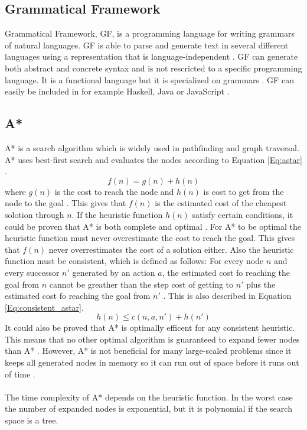 \subsection{Grammatical Framework}
Grammatical Framework, GF, is a programming language for writing grammars of natural languages. GF is able to parse and generate text in several different languages using a representation that is language-independent \citep{gf_url}. GF can generate both abstract and concrete syntax and is not rescricted to a specific programming language. It is a functional language but it is specialized on grammars \citep{gf_url}. 
GF can easily be included in for example Haskell, Java or JavaScript \citep{gf_url}.
\subsection{A*}
A* is a search algorithm which is widely used in pathfinding and graph traversal. A* uses best-first search and evaluates the nodes according to Equation \ref{Eq:astar} \citep{astar_ai}. 
\begin{equation}
f(n) = g(n) + h(n)
\label{Eq:astar}
\end{equation}
where $g(n)$ is the cost to reach the node and $h(n)$ is cost to get from the node to the goal \citep{astar_ai}. This gives that $f(n)$ is the estimated cost of the cheapest solotion through $n$. If the heuristic function $h(n)$ satisfy certain conditions, it could be proven that A* is both complete and optimal \citep{astar_ai}. For A* to be optimal the heuristic function must never overestimate the cost to reach the goal. This gives that $f(n)$ never overrestimates the cost of a solution either. Also the heuristic function must be consistent, which is defined as follows: For every node $n$ and every successor $n'$ generated by an action $a$, the estimated cost fo reaching the goal from $n$ cannot be greather than the step cost of getting to $n'$ plus the estimated cost fo reaching the goal from $n'$ \citep{astar_ai}. This is also described in Equation \ref{Eq:consistent_astar}.
\begin{equation}
h(n) \leq c(n, a, n') + h(n')
\label{Eq:consistent_astar}
\end{equation}
It could also be proved that A* is optimally efficent for any consistent heuristic. This means that no other optimal algorithm is guaranteed to expand fewer nodes than A* \citep{astar_ai}. However, A* is not beneficial for many large-scaled problems since it keeps all generated nodes in memory so it can run out of space before it runs out of time \citep{astar_ai}.\\\\
The time complexity of A* depends on the heuristic function. In the worst case the number of expanded nodes is exponential, but it is polynomial if the search space is a tree.
